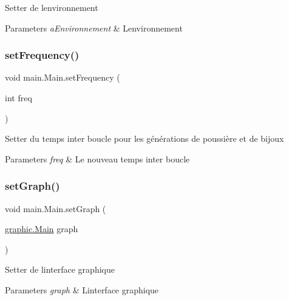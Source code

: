 Setter de l\textquotesingle{}environnement 
\begin{DoxyParams}{Parameters}
{\em a\+Environnement} & L\textquotesingle{}environnement \\
\hline
\end{DoxyParams}
\hypertarget{classmain_1_1_main_a3cec64baca52714fb67467ec5d793249}{}\label{classmain_1_1_main_a3cec64baca52714fb67467ec5d793249} 
\subsubsection{\texorpdfstring{set\+Frequency()}{setFrequency()}}
{\footnotesize\ttfamily void main.\+Main.\+set\+Frequency (\begin{DoxyParamCaption}\item[{int}]{freq }\end{DoxyParamCaption})}

Setter du temps inter boucle pour les générations de poussière et de bijoux 
\begin{DoxyParams}{Parameters}
{\em freq} & Le nouveau temps inter boucle \\
\hline
\end{DoxyParams}
\hypertarget{classmain_1_1_main_ab5524b1612bb914ee34f0f0c6cc89a5f}{}\label{classmain_1_1_main_ab5524b1612bb914ee34f0f0c6cc89a5f} 
\subsubsection{\texorpdfstring{set\+Graph()}{setGraph()}}
{\footnotesize\ttfamily void main.\+Main.\+set\+Graph (\begin{DoxyParamCaption}\item[{\hyperlink{classgraphic_1_1_main}{graphic.\+Main}}]{graph }\end{DoxyParamCaption})}

Setter de l\textquotesingle{}interface graphique 
\begin{DoxyParams}{Parameters}
{\em graph} & L\textquotesingle{}interface graphique \\
\hline
\end{DoxyParams}
\hypertarget{classmain_1_1_main_a300ba85da3a72bc7ca9ad5f5b5a104ed}{}\label{classmain_1_1_main_a300ba85da3a72bc7ca9ad5f5b5a104ed} 
